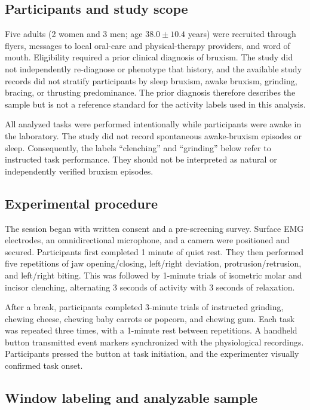 \documentclass[pdflatex,sn-nature,iicol]{sn-jnl}
\begin{document}
\subsection{Participants and study scope}

Five adults (2 women and 3 men; age $38.0 \pm 10.4$ years) were recruited through flyers, messages to local oral-care and physical-therapy providers, and word of mouth. Eligibility required a prior clinical diagnosis of bruxism. The study did not independently re-diagnose or phenotype that history, and the available study records did not stratify participants by sleep bruxism, awake bruxism, grinding, bracing, or thrusting predominance. The prior diagnosis therefore describes the sample but is not a reference standard for the activity labels used in this analysis.

All analyzed tasks were performed intentionally while participants were awake in the laboratory. The study did not record spontaneous awake-bruxism episodes or sleep. Consequently, the labels ``clenching'' and ``grinding'' below refer to instructed task performance. They should not be interpreted as natural or independently verified bruxism episodes.

\subsection{Experimental procedure}

The session began with written consent and a pre-screening survey. Surface EMG electrodes, an omnidirectional microphone, and a camera were positioned and secured. Participants first completed 1 minute of quiet rest. They then performed five repetitions of jaw opening/closing, left/right deviation, protrusion/retrusion, and left/right biting. This was followed by 1-minute trials of isometric molar and incisor clenching, alternating 3 seconds of activity with 3 seconds of relaxation.

After a break, participants completed 3-minute trials of instructed grinding, chewing cheese, chewing baby carrots or popcorn, and chewing gum. Each task was repeated three times, with a 1-minute rest between repetitions. A handheld button transmitted event markers synchronized with the physiological recordings. Participants pressed the button at task initiation, and the experimenter visually confirmed task onset.

\subsection{Window labeling and analyzable sample}
\end{document}
